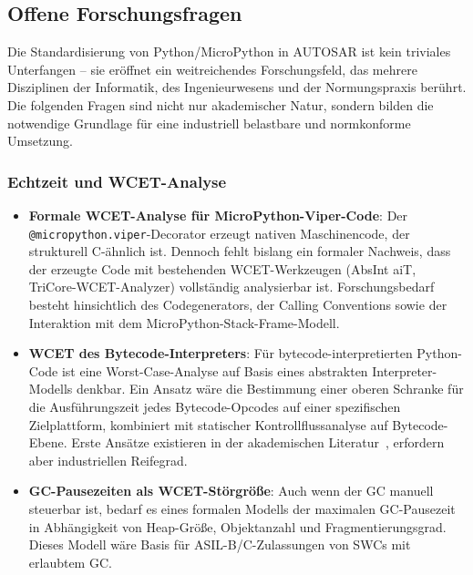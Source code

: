 ﻿\documentclass[12pt,a4paper,twoside]{article}
\begin{document}
\subsection{Offene Forschungsfragen}
\label{subsec:forschung}

Die Standardisierung von Python/MicroPython in AUTOSAR ist kein triviales
Unterfangen -- sie eröffnet ein weitreichendes Forschungsfeld, das mehrere
Disziplinen der Informatik, des Ingenieurwesens und der Normungspraxis berührt.
Die folgenden Fragen sind nicht nur akademischer Natur, sondern bilden die
notwendige Grundlage für eine industriell belastbare und normkonforme Umsetzung.

\subsubsection{Echtzeit und WCET-Analyse}

\begin{itemize}
  \item \textbf{Formale WCET-Analyse für MicroPython-Viper-Code}:
        Der \texttt{@micropython.\newline viper}-Decorator erzeugt nativen Maschinencode,
        der strukturell C-ähnlich ist. Dennoch fehlt bislang ein formaler Nachweis,
        dass der erzeugte Code mit bestehenden WCET-Werkzeugen (AbsInt aiT,
        TriCore-WCET-Analyzer) vollständig analysierbar ist.
        Forschungsbedarf besteht hinsichtlich des Codegenerators, der Calling Conventions
        sowie der Interaktion mit dem MicroPython-Stack-Frame-Modell.

  \item \textbf{WCET des Bytecode-Interpreters}:
        Für bytecode-interpretierten Python-Code ist eine Worst-Case-Analyse
        auf Basis eines abstrakten Interpreter-Modells denkbar.
        Ein Ansatz wäre die Bestimmung einer oberen Schranke für die
        Ausführungszeit jedes Bytecode-Opcodes auf einer spezifischen Zielplattform,
        kombiniert mit statischer Kontrollfluss\-analyse auf Bytecode-Ebene.
        Erste Ansätze existieren in der akademischen Literatur~\cite{micropython_wcet2023},
        erfordern aber industriellen Reifegrad.

  \item \textbf{GC-Pausezeiten als WCET-Störgröße}:
        Auch wenn der GC manuell steuerbar ist, bedarf es eines formalen
        Modells der maximalen GC-Pausezeit in Abhängigkeit von Heap-Größe,
        Objektanzahl und Fragmentierungsgrad.
        Dieses Modell wäre Basis für ASIL-B/C-Zulassungen von SWCs mit
        erlaubtem GC.
\end{itemize}
\end{document}
